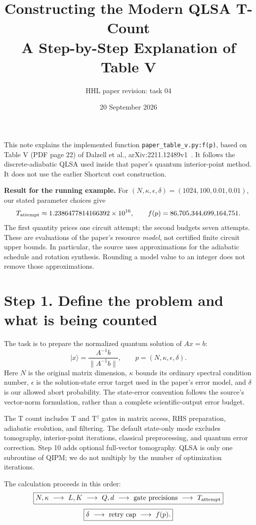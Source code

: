 \documentclass[11pt]{article}
\title{Constructing the Modern QLSA T-Count\\A Step-by-Step Explanation of Table V}
\author{HHL paper revision: task 04}
\date{20 September 2026}
\newcommand{\ket}[1]{\lvert#1\rangle}
\newcommand{\norm}[1]{\lVert#1\rVert}
\begin{document}
\maketitle
This note explains the implemented function \texttt{paper\_table\_v.py:f(p)}, based on Table V (PDF page 22) of Dalzell et al., arXiv:2211.12489v1~\cite{qipm}. It follows the discrete-adiabatic QLSA used inside that paper's quantum interior-point method. It does not use the earlier Shortcut cost construction.

\textbf{Result for the running example.} For $(N,\kappa,\epsilon,\delta)=(1024,100,0.01,0.01)$, our stated parameter choices give
\[
 T_{\rm attempt}\approx1.2386477814166392\times10^{16},\qquad
 f(p)=86{,}705{,}344{,}699{,}164{,}751.
\]
The first quantity prices one circuit attempt; the second budgets seven attempts. These are evaluations of the paper's resource \emph{model}, not certified finite circuit upper bounds. In particular, the source uses approximations for the adiabatic schedule and rotation synthesis. Rounding a model value to an integer does not remove those approximations.

\section*{Step 1. Define the problem and what is being counted}
The task is to prepare the normalized quantum solution of $Ax=b$:
\[
 \ket{x}=\frac{A^{-1}b}{\norm{A^{-1}b}},\qquad
 p=(N,\kappa,\epsilon,\delta).
\]
Here $N$ is the original matrix dimension, $\kappa$ bounds its ordinary spectral condition number, $\epsilon$ is the solution-state error target used in the paper's error model, and $\delta$ is our allowed abort probability. The state-error convention follows the source's vector-norm formulation, rather than a complete scientific-output error budget.

The T count includes T and T$^\dagger$ gates in matrix access, RHS preparation, adiabatic evolution, and filtering. The default state-only mode excludes tomography, interior-point iterations, classical preprocessing, and quantum error correction. Step 10 adds optional full-vector tomography. QLSA is only one subroutine of QIPM; we do not multiply by the number of optimization iterations.

The calculation proceeds in this order:
\[
\boxed{N,\kappa\ \longrightarrow\ L,K\ \longrightarrow\ Q,d
\ \longrightarrow\ \hbox{gate precisions}\ \longrightarrow\ T_{\rm attempt}}
\]
\[
\boxed{\delta\ \longrightarrow\ \hbox{retry cap}\ \longrightarrow\ f(p).}
\]
\end{document}
